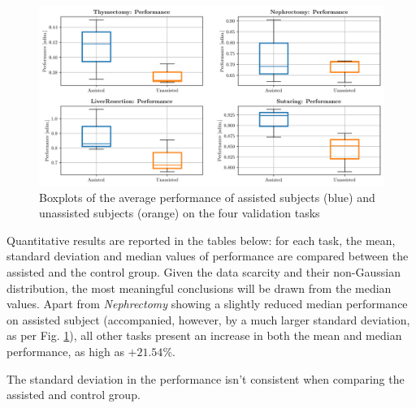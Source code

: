 \documentclass[../main.tex]{subfiles}
\begin{document}
\begin{figure}
    \centering
    \includegraphics[width=\textwidth]{images/performance_validation.png}
    \caption{Boxplots of the average performance of assisted subjects (blue) and unassisted subjects (orange) on the four validation tasks}
    \label{fig:performancevalidation}
\end{figure}

Quantitative results are reported in the tables below: for each task, the mean, standard deviation and median values of performance are compared between the assisted and the control group. Given the data scarcity and their non-Gaussian distribution, the most meaningful conclusions will be drawn from the median values. Apart from \textit{Nephrectomy} showing a slightly reduced median performance on assisted subject (accompanied, however, by a much larger standard deviation, as per Fig. \ref{fig:performancevalidation}), all other tasks present an increase in both the mean and median performance, as high as $+21.54\%$.

The standard deviation in the performance isn't consistent when comparing the assisted and control group. 
\end{document}
